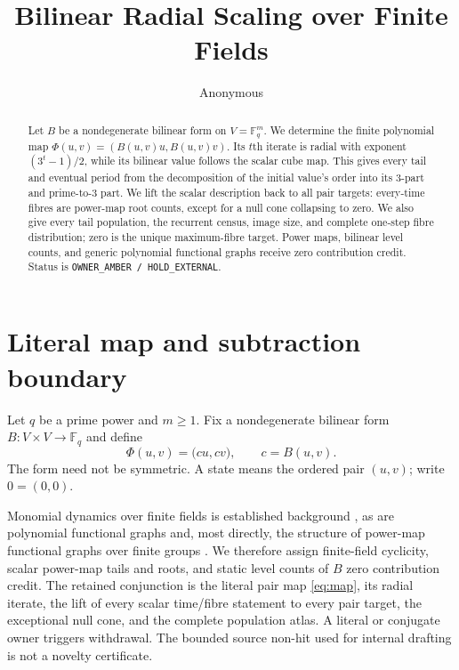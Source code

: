\documentclass[a4paper,10pt]{amsart}
\title[Bilinear radial scaling]{Bilinear Radial Scaling over Finite Fields}
\author{Anonymous}
\date{}
\theoremstyle{remark}
\newcommand{\Fq}{\mathbb F_q}
\newcommand{\1}{\mathbf 1}
\begin{document}
\begin{abstract}
Let $B$ be a nondegenerate bilinear form on $V=\mathbb F_q^m$.  We determine
the finite polynomial map
$\Phi(u,v)=(B(u,v)u,B(u,v)v)$.  Its $t$th iterate is radial with exponent
$(3^t-1)/2$, while its bilinear value follows the scalar cube map.  This
gives every tail and eventual period from the decomposition of the initial
value's order into its $3$-part and prime-to-$3$ part.  We lift the scalar
description back to all pair targets: every-time
fibres are power-map root counts, except for a null cone collapsing to zero.
We also give every tail population, the recurrent census, image size, and
complete one-step fibre distribution; zero is the unique maximum-fibre
target.  Power maps, bilinear level counts, and generic polynomial functional
graphs receive zero contribution credit.  Status is
\texttt{OWNER\_AMBER / HOLD\_EXTERNAL}.
\end{abstract}

\maketitle

\section{Literal map and subtraction boundary}

Let $q$ be a prime power and $m\ge1$.  Fix a nondegenerate bilinear form
$B:V\times V\to\Fq$ and define
\begin{equation}\label{eq:map}
 \Phi(u,v)=\bigl(cu,cv\bigr),\qquad c=B(u,v).
\end{equation}
The form need not be symmetric.  A state means the ordered pair $(u,v)$;
write $0=(0,0)$.

Monomial dynamics over finite fields is established background
\cite{ColonReyesEtAl2006}, as are polynomial functional graphs
\cite{KonyaginEtAl2016} and, most directly, the structure of power-map
functional graphs over finite groups \cite{QureshiReis2023}.  We therefore
assign finite-field cyclicity, scalar power-map tails and roots, and static
level counts of $B$ zero contribution credit.  The retained conjunction is
the literal pair map \eqref{eq:map}, its radial iterate, the lift of every
scalar time/fibre statement to every pair target, the exceptional null cone,
and the complete population atlas.  A literal or conjugate owner triggers
withdrawal.  The bounded source non-hit used for internal drafting is not a
novelty certificate.
\end{document}
